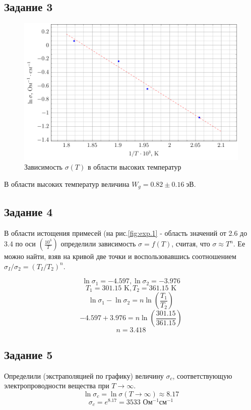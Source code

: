 \subsection*{Задание 3}
\begin{figure}[H]
	\centering
	\includegraphics[width=\linewidth]{plots/fig2.pdf}
	\caption*{Зависимость $\sigma(T)$ в области высоких температур}
\end{figure}
В области высоких температур величина $W_g = 0.82 \pm 0.16\;\text{эВ}$.
\subsection*{Задание 4}
В области истощения примесей (на рис.\ref{fig:exp.1} - область значений от 2.6 до 3.4 по оси $\displaystyle(\frac{10^3}{T})$ 
определили зависимость $\sigma = f(T)$, считая, что $\sigma \approx T^n$. Ее можно найти, взяв на кривой две точки и
воспользовавшись соотношением $\sigma_{I} / \sigma_{2}=\left(T_{I} / T_{2}\right)^{n}$.

$$\ln \sigma_1 = -4.597, \ln \sigma_2 = -3.976$$
$$ T_1 = 301.15\text{ K},T_2 = 361.15 \text{ K} $$
$$ \ln \sigma_1 - \ln \sigma_2 = n \ln(\frac{T_1}{T_2})$$
$$ -4.597+3.976 = n \ln(\frac{301.15}{361.15}) $$
$$ n = 3.418 $$

\subsection*{Задание 5}
Определили (экстраполяцией по графику) величину $\sigma_c$, соответствующую
электропроводности вещества при $T \to \infty$.
$$ \ln \sigma_c = \ln \sigma (T \to \infty) \approx 8.17$$
$$\sigma_c = e^{8.17}  = 3533\text{ Ом$^{-1}$см$^{-1}$}$$
